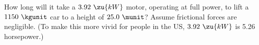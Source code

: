 How long will it take a $3.92\ \zu{kW}$ motor, operating at full power, to lift a $1150\ \kgunit$ car
to a height of
$25.0\ \munit$? Assume frictional forces are negligible. (To make this more vivid for
people in the US, $3.92\ \zu{kW}$ is 5.26 horsepower.)\answercheck
